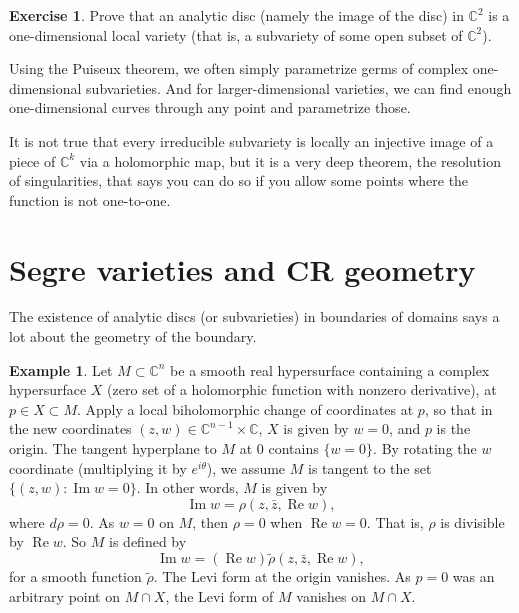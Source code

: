 \documentclass[12pt,openany]{book}
\renewcommand{\Re}{\operatorname{Re}}
\renewcommand{\Im}{\operatorname{Im}}
\newcommand{\C}{{\mathbb{C}}}
\theoremstyle{plain}
\theoremstyle{remark}
\theoremstyle{definition}
\newenvironment{exbox}{%
    \def\FrameCommand{\vrule width 1pt \relax\hspace{10pt}}%
    \MakeFramed{\advance\hsize-\width\FrameRestore}%
}{%
    \endMakeFramed
}
\theoremstyle{exercise}
\newtheorem{exercise}{Exercise}[section]
\theoremstyle{example}
\newtheorem{example}[thm]{Example}
\begin{document}
\begin{exbox}
\begin{exercise}
Prove that an analytic disc (namely the image of the disc) in $\C^2$
is a one-dimensional local variety (that is, a subvariety of some
open subset of $\C^2$).
\end{exercise}
\end{exbox}

Using the Puiseux theorem, we often simply parametrize germs
of complex one-dimensional subvarieties.
And for larger-dimensional varieties, we can find
enough one-dimensional curves through any point and parametrize those.

It is not true that every irreducible subvariety is locally
an injective image of a piece of
$\C^k$ via a holomorphic map, but it is a very deep theorem,
the resolution of singularities, that says you can do so if you allow some points
where the function is not one-to-one.


\section{Segre varieties and CR geometry} \label{sec:crgeomcr}

The existence of analytic discs (or subvarieties)
in boundaries of domains says a lot about the geometry of the boundary.

\begin{example}
Let $M \subset \C^n$ be a smooth real hypersurface containing
a complex hypersurface $X$ (zero set of a holomorphic function
with nonzero derivative), at $p \in X \subset M$.
Apply a local biholomorphic change of coordinates at $p$, so
that in the new coordinates
$(z,w) \in \C^{n-1} \times \C$,
$X$ is given by $w=0$, and $p$ is the origin.
The tangent hyperplane to $M$ at $0$ contains $\{ w=0 \}$.
By rotating the $w$ coordinate (multiplying it by $e^{i\theta}$),
we assume $M$ is tangent to the set $\bigl\{ (z,w) : \Im w = 0
\bigr\}$.
In other words,
$M$ is given by
\begin{equation*}
\Im w = \rho(z,\bar{z},\Re w) ,
\end{equation*}
where $d\rho = 0$.
As $w = 0$ on $M$, then $\rho = 0$
when $\Re w = 0$. That is, $\rho$
is divisible by $\Re w$.  So $M$ is defined by
\begin{equation*}
\Im w = (\Re w) \widetilde{\rho}(z,\bar{z},\Re w),
\end{equation*}
for a smooth function $\widetilde{\rho}$.
The Levi form at the origin vanishes.
As $p=0$ was an arbitrary point on $M \cap X$,
the Levi form of $M$ vanishes on $M \cap X$.
\end{example}
\end{document}
